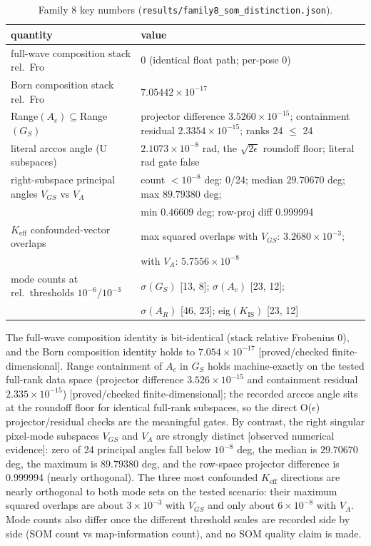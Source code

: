 \documentclass[12pt]{article}
\newcommand{\FDL}{\textnormal{[proved/checked finite-dimensional]}}
\newcommand{\OBS}{\textnormal{[observed numerical evidence]}}
\begin{document}
\begin{table}[htbp]
\centering
\small
\caption{Family 8 key numbers
(\texttt{results/family8\_som\_distinction.json}).}
\label{tab:f8}
\begin{tabular}{p{} p{}}
\toprule
quantity & value \\
\midrule
full-wave composition stack rel.\ Fro &
0 (identical float path; per-pose 0) \\
Born composition stack rel.\ Fro & $7.05442\times10^{-17}$ \\
Range$(A_c)\subseteq$Range$(G_S)$ &
projector difference $3.5260\times10^{-15}$; containment residual
$2.3354\times10^{-15}$; ranks 24 $\le$ 24 \\
literal arccos angle (U subspaces) &
$2.1073\times10^{-8}$ rad, the $\sqrt{2\epsilon}$ roundoff floor;
literal rad gate false \\
right-subspace principal angles $V_{GS}$ vs $V_A$ &
count $<10^{-8}$ deg: 0/24; median $29.70670$ deg; max $89.79380$ deg; \\
 & min $0.46609$ deg; row-proj diff 0.999994 \\
$K_{\mathrm{eff}}$ confounded-vector overlaps &
max squared overlaps with $V_{GS}$: $3.2680\times10^{-3}$; \\
 & with $V_A$: $5.7556\times10^{-8}$ \\
mode counts at rel.\ thresholds $10^{-6}$/$10^{-3}$ &
$\sigma(G_S)$ [13, 8]; $\sigma(A_c)$ [23, 12]; \\
 & $\sigma(A_R)$ [46, 23]; eig$(K_{\mathrm{IS}})$ [23, 12] \\
\bottomrule
\end{tabular}
\end{table}

The full-wave composition identity is bit-identical (stack relative Frobenius
0), and the Born composition identity holds to $7.054\times10^{-17}$
\FDL{}. Range containment of $A_c$ in $G_S$ holds machine-exactly on the
tested full-rank data space (projector difference $3.526\times10^{-15}$ and
containment residual $2.335\times10^{-15}$) \FDL{}; the recorded arccos angle
sits at the roundoff floor for identical full-rank subspaces, so the direct
O($\epsilon$) projector/residual checks are the meaningful gates. By contrast,
the right singular pixel-mode subspaces $V_{GS}$ and $V_A$ are strongly
distinct \OBS{}: zero of 24 principal angles fall below $10^{-8}$ deg, the
median is $29.70670$ deg, the maximum is $89.79380$ deg, and the row-space
projector difference is 0.999994 (nearly orthogonal). The three most
confounded $K_{\mathrm{eff}}$ directions are nearly orthogonal to both mode
sets on the tested scenario: their maximum squared overlaps are about
$3\times10^{-3}$ with $V_{GS}$ and only about $6\times10^{-8}$ with $V_A$.
Mode counts also differ once the different threshold scales are recorded
side by side (SOM count vs map-information count), and no SOM quality claim
is made.
\end{document}
